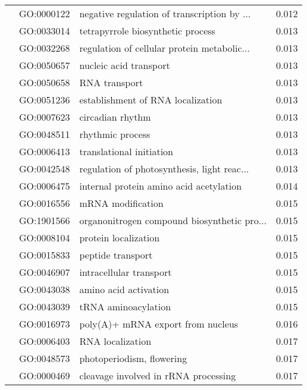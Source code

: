 \begin{longtable}{lllr}
   & GO:0000122 &  negative regulation of transcription by ... &         0.012 \\
   & GO:0033014 &            tetrapyrrole biosynthetic process &         0.013 \\
   & GO:0032268 &  regulation of cellular protein metabolic... &         0.013 \\
   & GO:0050657 &                       nucleic acid transport &         0.013 \\
   & GO:0050658 &                                RNA transport &         0.013 \\
   & GO:0051236 &            establishment of RNA localization &         0.013 \\
   & GO:0007623 &                             circadian rhythm &         0.013 \\
   & GO:0048511 &                             rhythmic process &         0.013 \\
   & GO:0006413 &                     translational initiation &         0.013 \\
   & GO:0042548 &  regulation of photosynthesis, light reac... &         0.013 \\
   & GO:0006475 &      internal protein amino acid acetylation &         0.014 \\
   & GO:0016556 &                            mRNA modification &         0.015 \\
   & GO:1901566 &  organonitrogen compound biosynthetic pro... &         0.015 \\
   & GO:0008104 &                         protein localization &         0.015 \\
   & GO:0015833 &                            peptide transport &         0.015 \\
   & GO:0046907 &                      intracellular transport &         0.015 \\
   & GO:0043038 &                        amino acid activation &         0.015 \\
   & GO:0043039 &                          tRNA aminoacylation &         0.015 \\
   & GO:0016973 &            poly(A)+ mRNA export from nucleus &         0.016 \\
   & GO:0006403 &                             RNA localization &         0.017 \\
   & GO:0048573 &                    photoperiodism, flowering &         0.017 \\
   & GO:0000469 &         cleavage involved in rRNA processing &         0.017 \\

\end{longtable}
